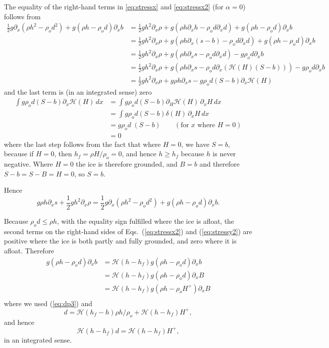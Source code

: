 \documentclass[10pt,a4paper]{book}
\newcommand{\He}{\mathcal{H}}
\newcommand{\p}{\partial}
\begin{document}
The equality of the right-hand terms in \eqref{eq:stressx} and
\eqref{eq:stressx2} (for $\alpha=0$) follows from
\begin{align*}
\frac{1}{2} g \p_x (\rho h^2 - \rho_o d^2)+g(\rho h -\rho_o d) \p_x b 
&= \frac{1}{2} g h^2 \p_x \rho + g  ( \rho h \p_x h - \rho_o d \p_x d)+g (\rho h -\rho_o d) \p_x b \\
&= \frac{1}{2} g h^2 \p_x \rho + g  ( \rho h \p_x (s-b) - \rho_o d \p_x d)+g (\rho h -\rho_o d) \p_x b \\
&=\frac{1}{2} g h^2 \p_x \rho + g  ( \rho h \p_x s - \rho_o d \p_x d)-g \rho_o d \p_x b \\
&=\frac{1}{2} g h^2 \p_x \rho + g  ( \rho h \p_x s - \rho_o d \p_x (\He(H) (S-b) ))-g \rho_o d \p_x b \\
&=\frac{1}{2} g h^2 \p_x \rho + g  \rho h \p_x s - g \rho_o d (S-b) \p_x \He(H)   
\end{align*}
and the last term is (in an integrated sense) zero
\begin{align*}
\int g \rho_o d (S-b) \p_x \He(H)  \, dx 
&= \int g \rho_o d (S-b) \p_H \He(H) \, \p_x H \, dx \\   
&= \int g \rho_o d (S-b) \delta(H) \, \p_x H \, dx \\   
&= g \rho_o d \; (S-b)   \qquad ( \text{for $x$ where $H=0$})\\
&=0
\end{align*}  
where the last step follows from the fact that where $H=0$, we have
$S=b$, because if $H=0$, then $h_f=\rho H/\rho_o=0$, and hence
$h \ge h_f$ because $h$ is never negative. Where $H=0$ the ice is therefore
grounded, and $B=b$ and therefore $S-b=S-B=H=0$, so $S=b$.

Hence
\begin{equation}
 g  \rho h \p_x s + \frac{1}{2} g h^2 \p_x \rho  = \frac{1}{2} g \p_x (\rho h^2 - \rho_o d^2)+g(\rho h -\rho_o d) \p_x b .
\label{eq:gencase}
\end{equation}

Because $\rho_o d \le \rho h$, with the equality sign fulfilled where
the ice is afloat, the second terms on the right-hand sides of
Eqs.~(\ref{eq:stressx2}) and (\ref{eq:stressy2}) are positive where
the ice is both partly and fully grounded, and zero where it is
afloat.  Therefore
\begin{align*} 
g(\rho h -\rho_o d) \p_x b &=  \He(h-h_f) g(\rho h -\rho_o d) \p_x b \\
                          &=  \He(h-h_f) g(\rho h -\rho_o d) \p_x B \\ 
                          &=  \He(h-h_f) g(\rho h -\rho_o H^{+}) \p_x B \\ 
\end{align*}
where we used (\ref{eq:dp3}) and
\[
 d=  \He(h_f-h) \rho h/\rho_o + \He(h-h_f) H^{+} ,
\]
and hence
\[
 \He(h-h_f) d=  \He(h-h_f) H^{+} ,
\]
in an integrated sense.
\end{document}
